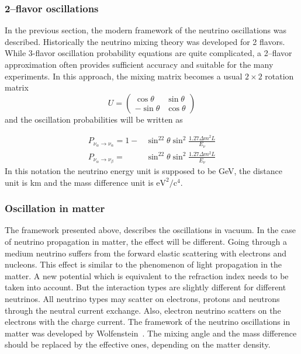 \documentclass[../main.tex]{subfiles}
\begin{document}
\subsubsection{2--flavor oscillations}
In the previous section, the modern framework of the neutrino oscillations was described. Historically the neutrino mixing theory was developed for 2 flavors. While 3-flavor oscillation probability equations are quite complicated, a 2--flavor approximation often provides sufficient accuracy and suitable for the many experiments. In this approach, the mixing matrix becomes a usual $2\times2$ rotation matrix
\begin{equation}
U=
\begin{pmatrix}
\cos\theta    & \sin\theta     \\
-\sin\theta   & \cos\theta
\end{pmatrix}
\end{equation}
and the oscillation probabilities will be written as

\begin{align}
P_{\nu_\alpha\to\nu_\alpha}=1-&\sin^22\theta\sin^2\frac{1.27\Delta m^2L}{E_\nu} \\
P_{\nu_\alpha\to\nu_\beta}=&\sin^22\theta\sin^2\frac{1.27\Delta m^2L}{E_\nu}
\end{align}
In this notation the neutrino energy unit is supposed to be GeV, the distance unit is km and the mass difference unit is $\text{eV}^2/\text{c}^4$.

\subsubsection{Oscillation in matter}
\label{sc:intro:mat}
The framework presented above, describes the oscillations in vacuum. In the case of neutrino propagation in matter, the effect will be different. Going through a medium neutrino suffers from the forward elastic scattering with electrons and nucleons. This effect is similar to the phenomenon of light propagation in the matter. A new potential which is equivalent to the refraction index needs to be taken into account. But the interaction types are slightly different for different neutrinos. All neutrino types may scatter on electrons, protons and neutrons through the neutral current exchange. Also, electron neutrino scatters on the electrons with the charge current. The framework of the neutrino oscillations in matter was developed by Wolfenstein~\cite{Wolfenstein1978}. The mixing angle and the mass difference should be replaced by the effective ones, depending on the matter density.
\end{document}
